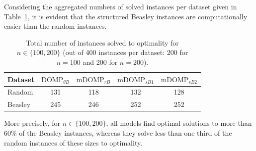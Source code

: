 \documentclass[letterpaper]{article}
\begin{document}
Considering the aggregated numbers of solved instances per dataset given in Table~\ref{tab:solved_random_vs_beasley}, it is evident that the structured Beasley instances are computationally easier than the random instances.
\begin{table}[ht]
    \centering
    \begin{tabular}{lcccc}
        \hline
        Dataset & $\text{DOMP}_{\theta B}$ & $\text{mDOMP}_{rB}$ & $\text{mDOMP}_{sB1}$ & $\text{mDOMP}_{sB2}$ \\
        \hline
        Random  & 131 & 118 & 132 & 128 \\
        Beasley & 245 & 246 & 252 & 252 \\
        \hline
    \end{tabular}
    \caption{Total number of instances solved to optimality for $n \in \{100, 200\}$ (out of 400 instances per dataset: 200 for $n = 100$ and 200 for $n = 200$).}
    \label{tab:solved_random_vs_beasley}
\end{table}
More precisely, for $n \in \{100, 200\}$, all models find optimal solutions to more than $60\%$ of the Beasley instances, whereas they solve less than one third of the random instances of these sizes to optimality.
\end{document}
